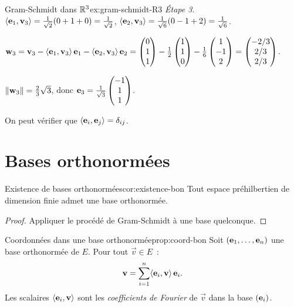 \begin{example}{Gram-Schmidt dans ${\mathbb{R}}^3$}{ex:gram-schmidt-R3}
  \emph{Étape 3.}
  $\langle\mathbf{e}_{1},\mathbf{v}_3\rangle
  =\frac{1}{\sqrt{2}}(0+1+0)=\frac{1}{\sqrt{2}}$,\quad
  $\langle\mathbf{e}_{2},\mathbf{v}_3\rangle
  =\frac{1}{\sqrt{6}}(0-1+2)=\frac{1}{\sqrt{6}}$.

  $\mathbf{w}_3=\mathbf{v}_3
  -\langle\mathbf{e}_{1},\mathbf{v}_3\rangle\,\mathbf{e}_{1}
  -\langle\mathbf{e}_{2},\mathbf{v}_3\rangle\,\mathbf{e}_{2}
  =\begin{pmatrix}0\\1\\1\end{pmatrix}
  -\frac{1}{2}\begin{pmatrix}1\\1\\0\end{pmatrix}
  -\frac{1}{6}\begin{pmatrix}1\\-1\\2\end{pmatrix}
  =\begin{pmatrix}-2/3\\2/3\\2/3\end{pmatrix}$.

  $\lVert\mathbf{w}_3\rVert=\frac{2}{3}\sqrt{3}$, donc
  $\mathbf{e}_{3}=\frac{1}{\sqrt{3}}\begin{pmatrix}-1\\1\\1\end{pmatrix}$.

  On peut vérifier que
  $\langle\mathbf{e}_{i},\mathbf{e}_{j}\rangle=\delta_{ij}$.
\end{example}

\section{Bases orthonormées}\label{sec:bases-orthonormees}

\begin{corollary}{Existence de bases orthonormées}{cor:existence-bon}
  Tout espace préhilbertien de dimension finie admet une base
  orthonormée.
\end{corollary}

\begin{proof}
  Appliquer le procédé de Gram-Schmidt à une base quelconque.
\end{proof}

\begin{proposition}{Coordonnées dans une base orthonormée}{prop:coord-bon}
  Soit $(\mathbf{e}_{1},\ldots,\mathbf{e}_{n})$ une base orthonormée de $E$. Pour
  tout $\vec{v}\in E$~:
  \[
    \mathbf{v}=\sum_{i=1}^n\langle\mathbf{e}_{i},\mathbf{v}\rangle\,\mathbf{e}_{i}.
  \]
  Les scalaires $\langle\mathbf{e}_{i},\mathbf{v}\rangle$ sont les \emph{coefficients
  de Fourier} de $\vec{v}$ dans la base
  $(\mathbf{e}_{i})$.
\end{proposition}

